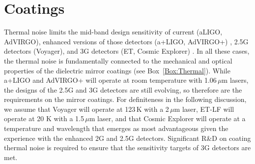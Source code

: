 \chapter{Coatings}
\label{sec:Coatings}

\vspace{1cm}



Thermal noise limits the mid-band design sensitivity of current (aLIGO, AdVIRGO)\cite{AdvancedVirgo2015, AdvancedLIGO2015}, enhanced versions of those detectors (a+LIGO, AdVIRGO+) \cite{Zucker:LIGOAplus, Cagnoli:VirgoAplus}, 2.5G detectors (Voyager)\cite{VoyagerDCC2018}, and 3G detectors (ET, Cosmic Explorer) \cite{ET2011,CosmicExplorer2017}. In all these cases, the thermal noise is fundamentally connected to the mechanical and optical properties of the dielectric mirror coatings (see Box~\ref{Box:Thermal}). While a+LIGO and AdVIRGO+ will operate at room temperature with 1.06\,$\mu$m lasers, the designs of the 2.5G and 3G detectors are still evolving, so therefore are the requirements on the mirror coatings. For definiteness in the following discussion, we assume that Voyager will operate at 123\,K with a 2\,$\mu$m laser, ET-LF will operate at 20 K with a 1.5\,$\mu$m laser, and that Cosmic Explorer will operate at a temperature and wavelength that emerges as most advantageous given the experience with the enhanced 2G and 2.5G detectors. Significant R\&D on coating thermal noise is required to ensure that the sensitivity targets of 3G detectors are met.

